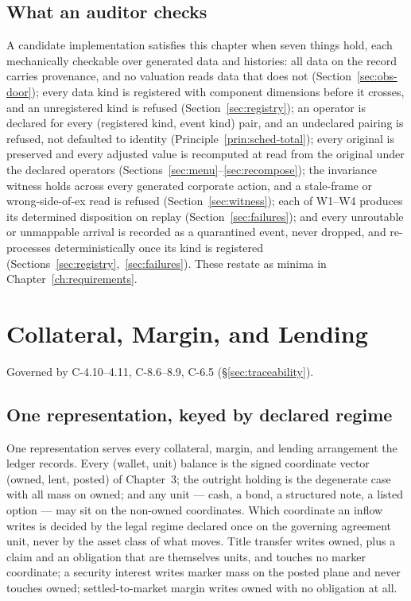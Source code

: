 \documentclass[11pt,a4paper]{article}
\begin{document}
\subsection{What an auditor checks}

A candidate implementation satisfies this chapter when seven things hold, each mechanically
checkable over generated data and histories: all data on the record carries provenance,
and no valuation reads data that does not (Section~\ref{sec:obs-door}); every data kind
is registered with component dimensions before it crosses, and an unregistered kind is
refused (Section~\ref{sec:registry}); an operator is declared for every (registered kind,
event kind) pair, and an undeclared pairing is refused, not defaulted to identity
(Principle~\ref{prin:sched-total}); every original is preserved and every adjusted value is
recomputed at read from the original under the declared operators
(Sections~\ref{sec:menu}--\ref{sec:recompose}); the invariance witness holds across every
generated corporate action, and a stale-frame or wrong-side-of-ex read is refused
(Section~\ref{sec:witness}); each of W1--W4 produces its determined disposition on
replay (Section~\ref{sec:failures}); and every unroutable or unmappable arrival is recorded
as a quarantined event, never dropped, and re-processes deterministically once its kind is
registered (Sections~\ref{sec:registry},~\ref{sec:failures}). These restate as minima in
Chapter~\ref{ch:requirements}.


\section{Collateral, Margin, and Lending}\label{ch:collateral}

Governed by C-4.10--4.11, C-8.6--8.9, C-6.5 (\S\ref{sec:traceability}).

\subsection{One representation, keyed by declared regime}

One representation serves every collateral, margin, and lending arrangement the
ledger records. Every (wallet, unit) balance is the signed coordinate vector
(owned, lent, posted) of Chapter~3; the outright holding is the degenerate case
with all mass on owned; and any unit --- cash, a bond, a structured note, a
listed option --- may sit on the non-owned coordinates. Which coordinate an
inflow writes is decided by the legal regime declared once on the governing
agreement unit, never by the asset class of what moves. Title transfer writes
owned, plus a claim and an obligation that are themselves units, and touches no
marker coordinate; a security interest writes marker mass on the posted plane
and never touches owned; settled-to-market margin writes owned with no
obligation at all.
\end{document}
